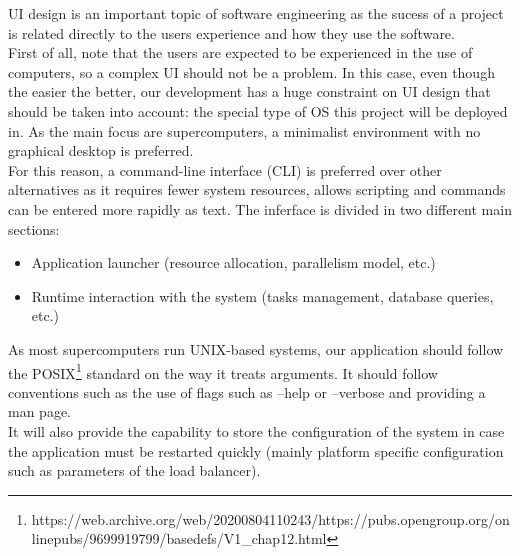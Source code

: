 UI design is an important topic of software engineering as the sucess of a
project is related directly to the users experience and how they use the
software.\\

First of all, note that the users are expected to be experienced in the use of
computers, so a complex UI should not be a problem. In this case, even though
the easier the better, our development has a huge constraint on UI design that
should be taken into account: the special type of OS this project
will be deployed in. As the main focus are supercomputers, a minimalist environment
with no graphical desktop is preferred.\\

For this reason, a command-line interface (CLI) is preferred over other
alternatives as it requires fewer system resources, allows scripting and commands
can be entered more rapidly as text. The inferface is divided in two different
main sections:\\
\begin{itemize}
  \item Application launcher (resource allocation, parallelism model, etc.)
  \item Runtime interaction with the system (tasks management, database
  queries, etc.)
\end{itemize}

As most supercomputers run UNIX-based systems, our application should follow
the POSIX\footnote{https://web.archive.org/web/20200804110243/https://pubs.opengroup.org/onlinepubs/9699919799/basedefs/V1_chap12.html} standard on the
way it treats arguments.
It should follow conventions such as the use of flags such as --help or
--verbose and providing a man page.\\

It will also provide the capability to store the configuration of the system in
case the application must be restarted quickly (mainly platform specific
configuration such as parameters of the load balancer). \\


